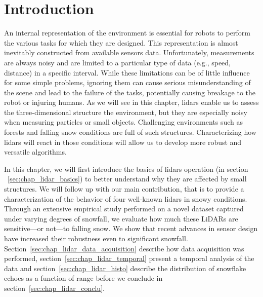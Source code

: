 \section{Introduction}
\label{sec:chap_lidar_intro}

An internal representation of the environment is essential for robots to perform the various tasks for which they are designed. This representation is almost inevitably constructed from available sensors data. Unfortunately, measurements are always noisy and are limited to a particular type of data (e.g., speed, distance) in a specific interval. While these limitations can be of little influence for some simple problems, ignoring them can cause serious misunderstanding of the scene and lead to the failure of the tasks, potentially causing breakage to the robot or injuring humans. As we will see in this chapter, \gls*{lidar}s enable us to assess the three-dimensional structure the environment, but they are especially noisy when measuring particles or small objects. Challenging environments such as forests and falling snow conditions are full of such structures. Characterizing how \gls*{lidar}s will react in those conditions will allow us to develop more robust and versatile algorithms.

In this chapter, we will first introduce the basics of \gls*{lidar}s operation (in section ~\ref{sec:chap_lidar_basics}) to better understand why they are affected by small structures. We will follow up with our main contribution, that is to provide a characterization of the behavior of four well-known \gls*{lidar}s in snowy conditions. Through an extensive empirical study performed on a novel dataset captured under varying degrees of snowfall, we evaluate how much these LiDARs are sensitive---or not---to falling snow. We show that recent advances in sensor design have increased their robustness even to significant snowfall. Section~\ref{sec:chap_lidar_data_acquisition} describe how data acquisition was performed, section~\ref{sec:chap_lidar_temporal} present a temporal analysis of the data and section~\ref{sec:chap_lidar_histo} describe the distribution of snowflake echoes as a function of range before we conclude in section~\ref{sec:chap_lidar_conclu}. 

